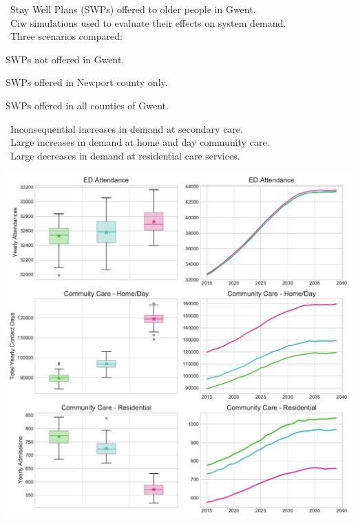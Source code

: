 \documentclass[usenames,dvipsnames,t]{beamer}
\begin{document}
\begin{center}
\begin{minipage}{0.35\textwidth}
    
\end{minipage}
\hspace{3mm}
\begin{minipage}{0.25\textwidth}
  \textbullet\ Stay Well Plans (SWPs) offered to older people in Gwent.\\[2mm]
  \textbullet\ Ciw simulations used to evaluate their effects on system demand.\\[2mm]
  \textbullet\ Three scenarios compared:\\[0.5mm]
  \begin{tcolorbox}[colback=nowhere!15,colframe=nowhere]
      SWPs not offered in Gwent.
  \end{tcolorbox}
  \begin{tcolorbox}[colback=newport!15,colframe=newport]
      SWPs offered in Newport county only.
  \end{tcolorbox}
  \begin{tcolorbox}[colback=everywhere!15,colframe=everywhere]
      SWPs offered in all counties of Gwent.
  \end{tcolorbox}
  \textbullet\ Inconsequential increases in demand at secondary care.\\[2mm]
  \textbullet\ Large increases in demand at home and day community care.\\[2mm]
  \textbullet\ Large decreases in demand at residential care services.
\end{minipage}
\hspace{3mm}
\begin{minipage}{0.35\textwidth}
    \includegraphics[width=\textwidth]{SWPplots}
\end{minipage}
\end{center}
\end{document}
